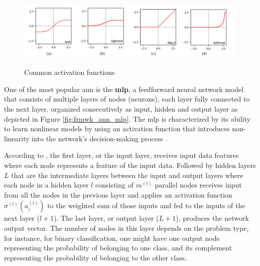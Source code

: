\begin{figure}[htbp]
    \raggedright
        \caption{Common activation functions}
        \includegraphics[width=1\textwidth]{resources/images/030-theoretical_framework/Framework_ann_activation_function.png}
        \label{fig:frmwk_ann_activation_functions}
\end{figure}

One of the most popular \gls{ann} is the \textbf{\gls{mlp}}, a feedforward neural network model that consists of multiple layers of nodes (neurons), each layer fully connected to the next layer, organized consecutively as input, hidden and output layer as depicted in Figure \ref{fig:frmwk_ann_mlp}. The \gls{mlp} is characterized by its ability to learn nonlinear models by using an activation function that introduces non-linearity into the network's decision-making process \cite{Mitchell1997}.

According to \textcite{Russel2010}, the first layer, or the input layer, receives input data features where each node represents a feature of the input data. Followed by hidden layers $L$ that are the intermediate layers between the input and output layers where each node in a hidden layer $l$ consisting of $m^{(l)}$ parallel nodes receives input from all the nodes in the previous layer and applies an activation function $\sigma^{(l)}(a_i^{(l)})$ to the weighted sum of those inputs and fed to the inputs of the next layer ($l+1$). The last layer, or output layer ($L+1$), produces the network output vector. The number of nodes in this layer depends on the problem type, for instance, for binary classification, one might have one output node representing the probability of belonging to one class, and its complement representing the probability of belonging to the other class. 

